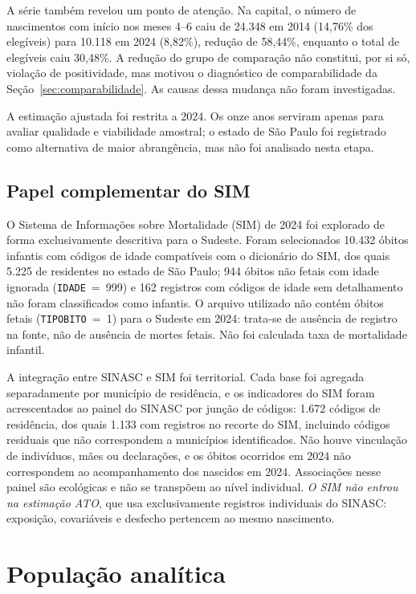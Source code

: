\documentclass[11pt,a4paper]{article}
\newcommand{\campo}[1]{\texttt{#1}}       %
\begin{document}
A série também revelou um ponto de atenção. Na capital, o número de nascimentos com
início nos meses 4--6 caiu de 24.348 em 2014 (14,76\% dos elegíveis) para 10.118 em 2024
(8,82\%), redução de 58,44\%, enquanto o total de elegíveis caiu 30,48\%. A redução do
grupo de comparação não constitui, por si só, violação de positividade, mas motivou o
diagnóstico de comparabilidade da Seção~\ref{sec:comparabilidade}. As causas dessa
mudança não foram investigadas.

A estimação ajustada foi restrita a 2024. Os onze anos serviram apenas para avaliar
qualidade e viabilidade amostral; o estado de São Paulo foi registrado como alternativa
de maior abrangência, mas não foi analisado nesta etapa.

\subsection{Papel complementar do SIM}

O Sistema de Informações sobre Mortalidade (SIM) de 2024 foi explorado de forma
exclusivamente descritiva para o Sudeste. Foram selecionados 10.432 óbitos infantis com
códigos de idade compatíveis com o dicionário do SIM, dos quais 5.225 de residentes no
estado de São Paulo; 944 óbitos não fetais com idade ignorada (\campo{IDADE}~=~999) e 162
registros com códigos de idade sem detalhamento não foram classificados como infantis. O
arquivo utilizado não contém óbitos fetais (\campo{TIPOBITO}~=~1) para o Sudeste em
2024: trata-se de ausência de registro na fonte, não de ausência de mortes fetais. Não
foi calculada taxa de mortalidade infantil.

A integração entre SINASC e SIM foi territorial. Cada base foi agregada separadamente por
município de residência, e os indicadores do SIM foram acrescentados ao painel do SINASC
por junção de códigos: 1.672 códigos de residência, dos quais 1.133 com registros no
recorte do SIM, incluindo códigos residuais que não correspondem a municípios
identificados. Não houve vinculação de indivíduos, mães ou declarações, e os óbitos
ocorridos em 2024 não correspondem ao acompanhamento dos nascidos em 2024. Associações
nesse painel são ecológicas e não se transpõem ao nível individual. \emph{O SIM não entrou
na estimação ATO}, que usa exclusivamente registros individuais do SINASC: exposição,
covariáveis e desfecho pertencem ao mesmo nascimento.

\section{População analítica}\label{sec:populacao}
\end{document}
